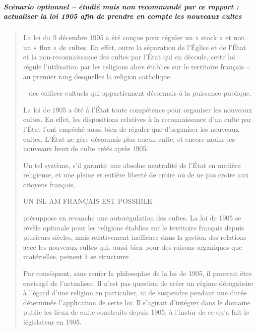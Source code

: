 \hypertarget{scuxe9nario-optionnel-uxe9tudiuxe9-mais-non-recommanduxe9-par-ce-rapport-actualiser-la-loi-1905-afin-de-prendre-en-compte-les-nouveaux-cultes}{%
\subparagraph{Scénario optionnel -- étudié mais non recommandé par ce
rapport : actualiser la loi 1905 afin de prendre en compte les nouveaux
cultes}\label{scuxe9nario-optionnel-uxe9tudiuxe9-mais-non-recommanduxe9-par-ce-rapport-actualiser-la-loi-1905-afin-de-prendre-en-compte-les-nouveaux-cultes}}

\begin{quote}
La loi du 9 décembre 1905 a été conçue pour réguler un « stock » et non
un « flux » de cultes. En effet, outre la séparation de l'Église et de
l'État et la non-reconnaissance des cultes par l'État qui en découle,
cette loi régule l'utilisation par les religions alors établies sur le
territoire français -- au premier rang desquelles la religion catholique

-- des édifices cultuels qui appartiennent désormais à la puissance
publique.

La loi de 1905 a ôté à l'État toute compétence pour organiser les
nouveaux cultes. En effet, les dispositions relatives à la
reconnaissance d'un culte par l'État l'ont empêché aussi bien de réguler
que d'organiser les nouveaux cultes. L'État ne gère désormais plus aucun
culte, et encore moins les nouveaux lieux de culte créés après 1905.

Un tel système, s'il garantit une absolue neutralité de l'État en
matière religieuse, et une pleine et entière liberté de croire ou de ne
pas croire aux citoyens français,

UN ISL AM FRANÇAIS EST POSSIBLE

présuppose en revanche une autorégulation des cultes. La loi de 1905 se
révèle optimale pour les religions établies sur le territoire français
depuis plusieurs siècles, mais relativement inefficace dans la gestion
des relations avec les nouveaux cultes qui, aussi bien pour des raisons
organiques que matérielles, peinent à se structurer.

Par conséquent, sans renier la philosophie de la loi de 1905, il
pourrait être envisagé de l'actualiser. Il n'est pas question de créer
un régime dérogatoire à l'égard d'une religion en particulier, ni de
suspendre pendant une durée déterminée l'application de cette loi. Il
s'agirait d'intégrer dans le domaine public les lieux de culte
construits depuis 1905, à l'instar de ce qu'a fait le législateur en
1905.
\end{quote}


